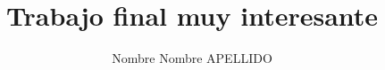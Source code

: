 %
%
%
%
%
% 
%  






%



\usepackage{titling}
\title{Trabajo final muy interesante}
\author{Nombre Nombre APELLIDO}







